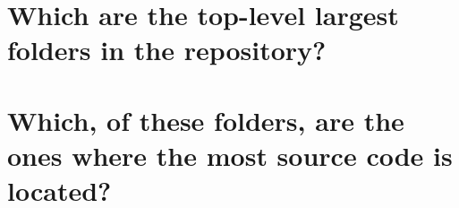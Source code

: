 \section*{Which are the top-level largest folders in the repository?}

\section*{Which, of these folders, are the ones where the most source code is located?}